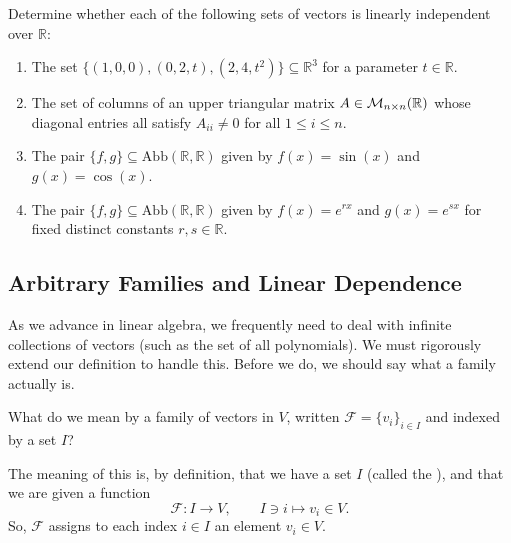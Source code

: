 \begin{exercise}
\label{exc:linear_independence_various_contexts}
Determine whether each of the following sets of vectors is linearly independent over $\mathbb{R}$:
\begin{enumerate}
    \item The set $\{(1, 0, 0), (0, 2, t), (2, 4, t^2)\} \subseteq \mathbb{R}^3$ for a parameter $t \in \mathbb{R}$.
    \item The set of columns of an upper triangular matrix $A \in \mathcal{M}_{n \times n}(\mathbb{R})$ whose diagonal entries all satisfy $A_{ii} \ne 0$ for all $1 \le i \le n$.
    \item The pair $\{f, g\} \subseteq \mathrm{Abb}(\mathbb{R}, \mathbb{R})$ given by $f(x) = \sin(x)$ and $g(x) = \cos(x)$.
    \item The pair $\{f, g\} \subseteq \mathrm{Abb}(\mathbb{R}, \mathbb{R})$ given by $f(x) = e^{rx}$ and $g(x) = e^{sx}$ for fixed distinct constants $r, s \in \mathbb{R}$.
\end{enumerate}
\end{exercise}

\subsection{Arbitrary Families and Linear Dependence}

As we advance in linear algebra, we frequently need to deal with infinite collections of vectors (such as the set of all polynomials). We must rigorously extend our definition to handle this. Before we do, we should say what a family actually is.

\begin{question}
\label{q:what_is_a_family}
What do we mean by a family of vectors in $V$, written $\mathcal{F} = \{v_i\}_{i \in I}$ and indexed by a set $I$?
\end{question}

\begin{definition}[Family]
\label{def:family}
The meaning of this is, by definition, that we have a set $I$ (called the ), and that we are given a function
\[
\mathcal{F} \colon I \longrightarrow V, \qquad I \ni i \longmapsto v_i \in V.
\]
So, $\mathcal{F}$ assigns to each index $i \in I$ an element $v_i \in V$.
\end{definition}

